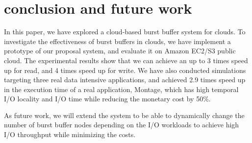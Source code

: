 \section{conclusion and future work}
\label{sec:conclusion}
In this paper, we have explored a cloud-based burst buffer system for clouds.
To investigate the effectiveness of burst buffers in clouds,
we have implement a prototype of our proposal system, and evaluate it on Amazon
EC2/S3 public cloud.
The experimental results show that we can achieve an up to 3 times speed up for
read, and 4 times speed up for write.
We have also conducted simulations targeting three real data
intensive applications, and achieved 2.9 times speed up in the execution time
of a real application, Montage, which has high temporal I/O locality and I/O
time while reducing the monetary cost by 50\%.

As future work, we will extend the system to be able to dynamically change the
number of burst buffer nodes depending on the I/O workloads to achieve high I/O
throughput while minimizing the costs.

